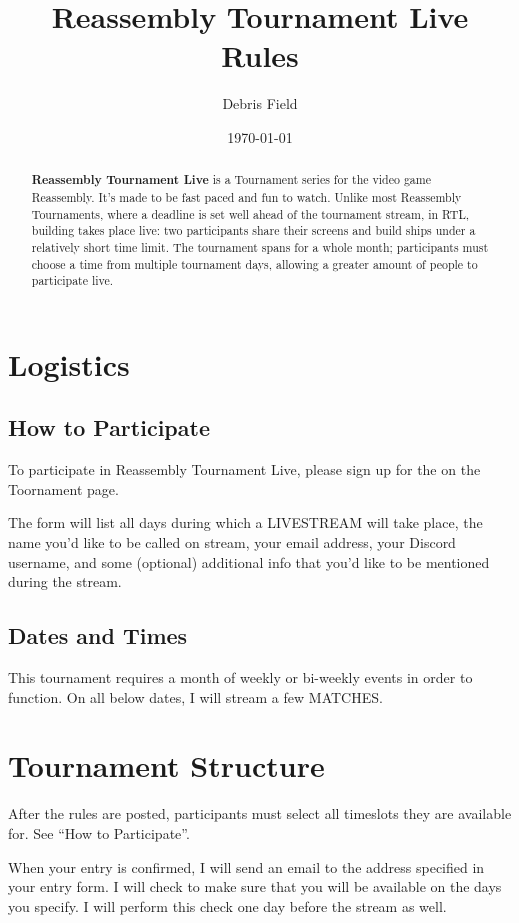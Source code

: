 \documentclass[11pt]{article}
\newcommand{\RTL}{Reassembly Tournament Live}
\newcommand{\termemph}[1]{\uppercase{#1}}
\begin{document}
\title{Reassembly Tournament Live Rules}
\author{Debris Field}
\date{\today}
\maketitle

\begin{abstract}
\textbf{\RTL{}} is a Tournament
series for the video game Reassembly. It's made to be fast paced and
fun to watch. Unlike most Reassembly Tournaments, where
a deadline is set well ahead of the tournament stream, in RTL,
building takes place live: two participants share their screens and
build ships under a relatively short time limit. The tournament spans
for a whole month; participants must choose a time from multiple
tournament days, allowing a greater amount of people to participate live.

\end{abstract}

\tableofcontents

\section{Logistics}
\subsection{How to Participate}
To participate in \RTL{}, please sign up for the on the Toornament page.

The form will list all days during which a \termemph{Livestream} will take place, the name you'd like to
be called on stream, your email address, your Discord username, and 
some (optional) additional info that you'd like to be mentioned during the stream.

\subsection{Dates and Times}
This tournament requires a month of weekly or bi-weekly events in order to function. On all
below dates, I will stream a few \termemph{matches}.  

\section{Tournament Structure}
After the rules are posted, participants must select all timeslots they are available for.
See ``How to Participate''.

When your entry is confirmed, I will send an email to the address specified in your entry form.
I will check to make sure that you will be available on the days you specify.
I will perform this check one day before the stream as well.
\end{document}
